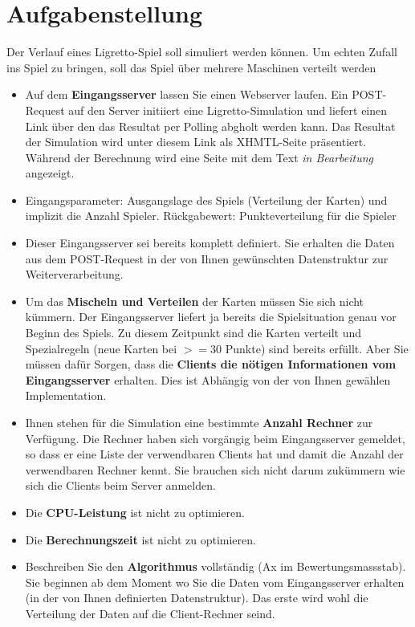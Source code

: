 \section{Aufgabenstellung} 

Der Verlauf eines Ligretto-Spiel soll simuliert werden können. Um echten Zufall ins Spiel zu bringen, soll das Spiel über mehrere Maschinen verteilt werden

 \begin{itemize}
 \item Auf dem \textbf{Eingangsserver} lassen Sie einen Webserver laufen. Ein POST-Request auf den Server initiiert eine Ligretto-Simulation und liefert einen Link über den das Resultat per Polling abgholt werden kann. Das Resultat der Simulation wird  unter diesem Link als XHMTL-Seite präsentiert. Während der Berechnung wird eine Seite mit dem Text \textit{in Bearbeitung} angezeigt.
 \item Eingangsparameter: Ausgangslage des Spiels (Verteilung der Karten) und implizit die Anzahl Spieler. Rückgabewert: Punkteverteilung für die Spieler
 \item Dieser Eingangsserver sei bereits komplett definiert. Sie erhalten die Daten aus dem POST-Request in der von Ihnen gewünschten Datenstruktur zur Weiterverarbeitung.
 \item Um das \textbf{Mischeln und Verteilen} der Karten müssen Sie sich nicht kümmern. Der Eingangsserver liefert ja bereits die Spielsituation genau vor Beginn des Spiels. Zu diesem Zeitpunkt sind die Karten verteilt und Spezialregeln (neue Karten bei $>= 30$ Punkte) sind bereits erfüllt. Aber Sie müssen dafür Sorgen, dass die \textbf{Clients die nötigen Informationen vom Eingangsserver} erhalten. Dies ist Abhängig von der von Ihnen gewählen Implementation.
 \item Ihnen stehen für die Simulation eine bestimmte \textbf{Anzahl Rechner} zur Verfügung. Die Rechner haben sich vorgängig beim Eingangsserver gemeldet, so dass er eine Liste der verwendbaren Clients hat und damit die Anzahl der verwendbaren Rechner kennt. Sie brauchen sich nicht darum zukümmern wie sich die Clients beim Server anmelden.
 \item Die \textbf{CPU-Leistung} ist nicht zu optimieren.
 \item Die \textbf{Berechnungszeit} ist  nicht zu optimieren.
 \item Beschreiben Sie den \textbf{Algorithmus} vollständig (Ax im Bewertungsmassstab). Sie beginnen ab dem Moment wo Sie die Daten vom Eingangsserver erhalten (in der von Ihnen definierten Datenstruktur). Das erste wird wohl die Verteilung der Daten auf die Client-Rechner seind.

\end{itemize}
